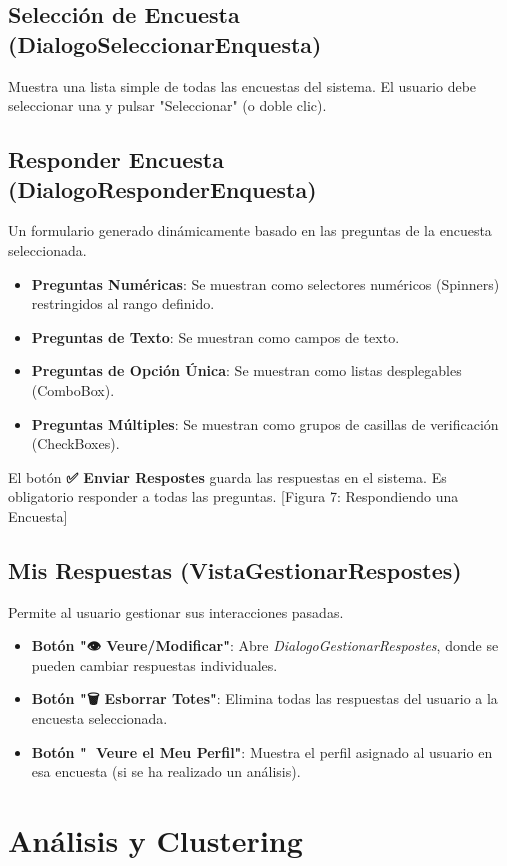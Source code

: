 \documentclass[a4paper,12pt]{article}
\begin{document}
\subsection{Selección de Encuesta (DialogoSeleccionarEnquesta)}
Muestra una lista simple de todas las encuestas del sistema. El usuario debe seleccionar una y pulsar "Seleccionar" (o doble clic).

\subsection{Responder Encuesta (DialogoResponderEnquesta)}
Un formulario generado dinámicamente basado en las preguntas de la encuesta seleccionada.
\begin{itemize}
    \item \textbf{Preguntas Numéricas}: Se muestran como selectores numéricos (Spinners) restringidos al rango definido.
    \item \textbf{Preguntas de Texto}: Se muestran como campos de texto.
    \item \textbf{Preguntas de Opción Única}: Se muestran como listas desplegables (ComboBox).
    \item \textbf{Preguntas Múltiples}: Se muestran como grupos de casillas de verificación (CheckBoxes).
\end{itemize}
El botón \textbf{✅ Enviar Respostes} guarda las respuestas en el sistema. Es obligatorio responder a todas las preguntas.
[Figura 7: Respondiendo una Encuesta]

\subsection{Mis Respuestas (VistaGestionarRespostes)}
Permite al usuario gestionar sus interacciones pasadas.
\begin{itemize}
    \item \textbf{Botón "👁️ Veure/Modificar"}: Abre \textit{DialogoGestionarRespostes}, donde se pueden cambiar respuestas individuales.
    \item \textbf{Botón "🗑️ Esborrar Totes"}: Elimina todas las respuestas del usuario a la encuesta seleccionada.
    \item \textbf{Botón "👤 Veure el Meu Perfil"}: Muestra el perfil asignado al usuario en esa encuesta (si se ha realizado un análisis).
\end{itemize}

\section{Análisis y Clustering}
\end{document}
